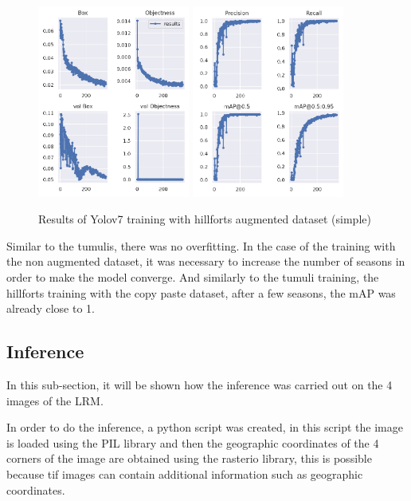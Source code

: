 \begin{figure}[H]
    \centering
    {{\includegraphics[width=5cm]{images/training/castros/maia1.png} }}
    \qquad
    {{\includegraphics[width=5cm]{images/training/castros/maia2.png} }}
    \caption{Results of Yolov7 training with hillforts augmented dataset (simple)}
    \label{Results of Yolov7 training with hillforts augmented dataset (simple)}
\end{figure}

Similar to the tumulis, there was no overfitting. In the case of the training with the non augmented dataset, it was necessary to increase the number of seasons in order to make the model converge. And similarly to the tumuli training, the hillforts training with the copy paste dataset, after a few seasons, the mAP was already close to 1.



\subsection{Inference}
In this sub-section, it will be shown how the inference was carried out on the 4 images of the LRM.

In order to do the inference, a python script was created, in this script the image is loaded using the PIL library and then the geographic coordinates of the 4 corners of the image are obtained using the rasterio library, this is possible because tif images can contain additional information such as geographic coordinates. 

